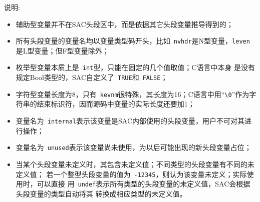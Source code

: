 说明:

\begin{itemize}
\item 辅助型变量并不在SAC头段区中，而是依据其它头段变量推导得到的；
\item 所有头段变量的变量名均以变量类型码开头，比如~\verb+nvhdr+是N型变量，\verb+leven+是L型变量；但F型变量除外；
\item 枚举型变量本质上是~\verb+int+型，只能在固定的几个值取值；C语言中本身
是没有规定Bool类型的，SAC自定义了~\verb+TRUE+和~\verb+FALSE+；
\item 字符型变量长度为8，只有~\verb+kevnm+很特殊，其长度为16；C语言中用``\verb+\0+''作为字符串的结束标识符，因而源码中变量的实际长度还要加1；
\item 变量名为~\verb+internal+表示该变量是SAC内部使用的头段变量，用户不可对其进行操作；
\item 变量名为~\verb+unused+表示该变量尚未使用，为以后可能出现的新头段变量占位；
\item 当某个头段变量未定义时，其包含未定义值；不同类型的头段变量有不同的未定义值；
    若一个整型头段变量的值为~\verb+-12345+，则认为该变量未定义；实际使用时，可以直接
    用~\verb+undef+表示所有类型的头段变量的未定义值，SAC会根据头段变量的类型自动将其
    转换成相应类型的未定义值。
\end{itemize}
